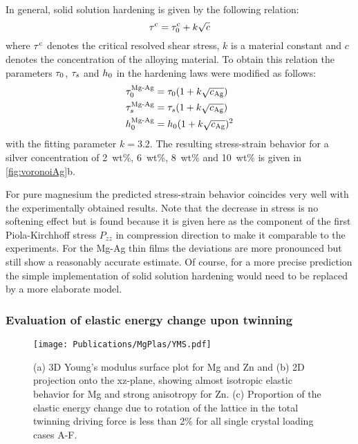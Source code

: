   In general, solid solution hardening is given by the following relation:
  \begin{equation}
    \tau^{\rm c} = \tau_0^{\rm c} + k\sqrt{c}
  \end{equation}
  where $\tau^{\rm c}$ denotes the critical resolved shear stress, $k$ is a material constant and $c$ denotes the concentration of the alloying material. To obtain this relation the parameters $\tau_0$, $\tau_s$ and ${h}_{0}$ in the hardening laws were modified as follows: 
  \begin{align}
    \tau_0^{\text{Mg-Ag}} &= \tau_0 (1+k\sqrt{c_{\rm Ag}}) \\
    \tau_s^{\text{Mg-Ag}} &= \tau_s (1+k\sqrt{c_{\rm Ag}}) \\
    {h}_{0}^{\text{Mg-Ag}} &= {h}_{0} (1+k\sqrt{c_{\rm Ag}})^2 
  \end{align}
  with the fitting parameter $k=3.2$. The resulting stress-strain behavior for a silver concentration of 2~wt\%, 6~wt\%, 8~wt\% and 10~wt\% is given in \cref{fig:voronoiAg}b. 
  
  For pure magnesium the predicted stress-strain behavior coincides very well with the experimentally obtained results. Note that the decrease in stress is no softening effect but is found because it is given here as the component of the first Piola-Kirchhoff stress $P_{zz}$ in compression direction to make it comparable to the experiments. For the Mg-Ag thin films the deviations are more pronounced but still show a reasonably accurate estimate. Of course, for a more precise prediction the simple implementation of solid solution hardening would need to be replaced by a more elaborate model. 
  
  \subsubsection{Evaluation of elastic energy change upon twinning} \label{sec:EvalEnegeryChange} %
  
  \begin{figure}[!ht]
    \centering
    \texttt{[image: Publications/MgPlas/YMS.pdf]}
    \caption{(a) 3D Young's modulus surface plot for Mg and Zn and (b) 2D projection onto the xz-plane, showing almost isotropic elastic behavior for Mg and strong anisotropy for Zn. (c) Proportion of the elastic energy change due to rotation of the lattice in the total twinning driving force is less than 2\% for all single crystal loading cases A-F. }
    \label{fig:YMS}
  \end{figure}
  
